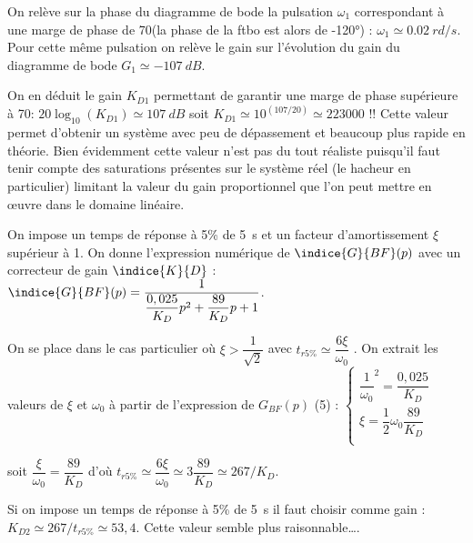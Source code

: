 \ifprof
\begin{corrige}%
On relève sur la phase du diagramme de bode la pulsation $\omega_1$ correspondant à une marge de phase de 70\degres (la phase de la ftbo est alors de -120°) : $\omega_1\simeq \SI{0.02}{rd/s}$. Pour cette même pulsation on relève le gain sur l’évolution du gain du diagramme de bode $G_1 \simeq -\SI{107}{dB}$.

On en déduit le gain $K_{D1}$ permettant de garantir une marge de phase supérieure à 70\degres :
$20\log_10 (K_{D1})\simeq \SI{107}{dB}$ soit $K_{D1}\simeq 10^(107/20)\simeq 223000$ !!
Cette valeur permet d’obtenir un système avec peu de dépassement et beaucoup plus rapide en théorie. Bien évidemment cette valeur n’est pas du tout réaliste puisqu’il faut tenir compte des saturations présentes sur le système réel (le hacheur en particulier) limitant la valeur du gain proportionnel que l’on peut mettre en œuvre dans le domaine linéaire.

\end{corrige}
\else
\fi

\ifprof
\else
 On impose un temps de réponse à 5\% de \SI{5}{s} et un facteur d’amortissement $\xi$ supérieur à 1.
 On donne l’expression numérique de $\indice{G}{BF}(p)$ avec un correcteur de gain $\indice{K}{D}$ :
 $\indice{G}{BF}(p)=\dfrac{1}{\dfrac{0,025}{K_D}p^2+\dfrac{89}{K_D}p +1}$.
 \fi
 
\ifprof
\begin{corrige}%
On se place dans le cas particulier où $\xi>\dfrac{1}{\sqrt{2}}$ avec $t_{r5\%}\simeq \dfrac{6 \xi}{\omega_0}$ . On extrait les valeurs de $\xi$ et $\omega_0$ à partir de l’expression de $G_{BF}(p)$ (5) :
$\left\{
\begin{array}{l}
\dfrac{1}{\omega_0 }^2=\dfrac{0,025}{K_D} \\
\xi =\dfrac{1}{2}\omega_0 \dfrac{89}{K_D}   \\
\end{array}
\right.
$

soit $\dfrac{\xi}{\omega_0} =\dfrac{89}{K_D}$  d’où $t_{r5\%}\simeq \dfrac{6\xi}{\omega_0} \simeq 3 \dfrac{89}{K_D}\simeq 267/K_D$.
  
Si on impose un temps de réponse à 5\% de \SI{5}{s} il faut choisir comme gain : $K_{D2}\simeq 267/t_{r5\%} \simeq 53,4$.
Cette valeur semble plus raisonnable….

\end{corrige}
\else
\fi


